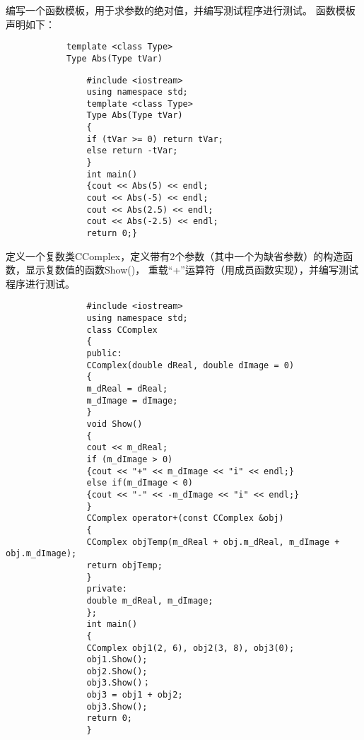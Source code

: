 \documentclass[sealed,answers,prescorebox]{nwsuafexam}%
\begin{document}
\begin{questions}
	    \question
	    编写一个函数模板，用于求参数的绝对值，并编写测试程序进行测试。
	    函数模板声明如下：
	    \begin{flushleft}
	    	\wuhao
	    	\begin{verbatim}
	    	template <class Type>
	    	Type Abs(Type tVar)
	    	\end{verbatim}
	    \end{flushleft}
	    \begin{Answers}[0]
	    	\begin{flushleft}
	    		\wuhao
	    		\begin{verbatim}
	    		#include <iostream>
	    		using namespace std;
	    		template <class Type>
	    		Type Abs(Type tVar)
	    		{
	    		if (tVar >= 0) return tVar;
	    		else return -tVar;
	    		}
	    		int main()
	    		{cout << Abs(5) << endl;
	    		cout << Abs(-5) << endl;
	    		cout << Abs(2.5) << endl;
	    		cout << Abs(-2.5) << endl;
	    		return 0;}
	    		\end{verbatim}
	    	\end{flushleft}
	    \end{Answers}
	    
	    \question
	    定义一个复数类CComplex，定义带有2个参数（其中一个为缺省参数）的构造函数，显示复数值的函数Show()， 重载“+”运算符（用成员函数实现），并编写测试程序进行测试。
	    \begin{Answers}[0]
	    	\begin{flushleft}
	    		\wuhao
	    		\begin{verbatim}
	    		#include <iostream>
	    		using namespace std;
	    		class CComplex
	    		{
	    		public:
	    		CComplex(double dReal, double dImage = 0)
	    		{
	    		m_dReal = dReal;
	    		m_dImage = dImage;
	    		}
	    		void Show()
	    		{
	    		cout << m_dReal;
	    		if (m_dImage > 0)
	    		{cout << "+" << m_dImage << "i" << endl;}
	    		else if(m_dImage < 0)
	    		{cout << "-" << -m_dImage << "i" << endl;}
	    		}
	    		CComplex operator+(const CComplex &obj)
	    		{
	    		CComplex objTemp(m_dReal + obj.m_dReal, m_dImage + obj.m_dImage);
	    		return objTemp;
	    		}
	    		private:
	    		double m_dReal, m_dImage;
	    		};
	    		int main()
	    		{
	    		CComplex obj1(2, 6), obj2(3, 8), obj3(0);
	    		obj1.Show();
	    		obj2.Show();
	    		obj3.Show()；
	    		obj3 = obj1 + obj2;
	    		obj3.Show();
	    		return 0;
	    		}
	    		\end{verbatim}
	    	\end{flushleft}	
	    \end{Answers}
	\end{questions}
\end{document}
